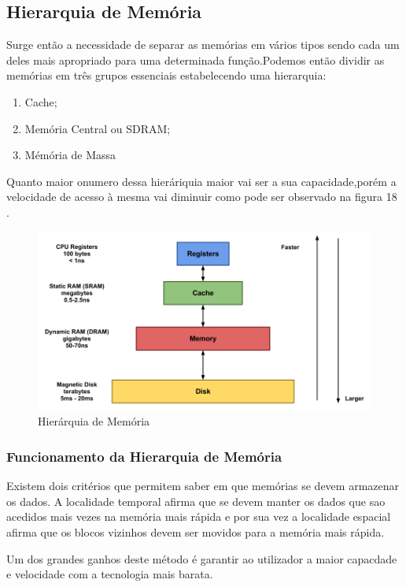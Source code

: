 \documentclass[10pt,a4paper]{paper}
\begin{document}
\subsection*{Hierarquia de Memória}


Surge então a necessidade de separar as memórias em vários tipos sendo cada um deles mais apropriado para uma determinada função.Podemos então dividir as memórias em três grupos essenciais estabelecendo uma hierarquia:
\begin{enumerate}
\item Cache;
\item Memória Central ou SDRAM;
\item Mémória de Massa
\end{enumerate}

Quanto maior onumero dessa hieráriquia maior vai ser a sua capacidade,porém a velocidade de acesso à mesma vai diminuir como pode ser observado na figura 18 .

	
	\begin{figure}[ht]
		\includegraphics[scale=0.35] {fig18.png}
		\centering
		\caption {Hierárquia de Memória}
		\label{fig:figura18}
	\end{figure}


\subsubsection*{Funcionamento da Hierarquia de Memória}

Existem dois critérios que permitem saber em que memórias se devem armazenar os dados.
A localidade temporal afirma que se devem manter os dados que sao acedidos mais vezes na memória mais rápida e por sua vez a localidade espacial afirma que os blocos vizinhos devem ser movidos para a memória mais rápida.

Um dos grandes ganhos deste método é garantir ao utilizador a maior capacdade e velocidade com a tecnologia mais barata.
\end{document}
